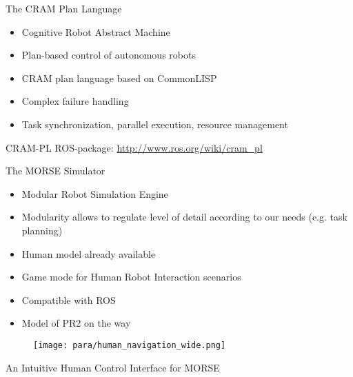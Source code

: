 \documentclass{beamer}
\begin{document}
\label{sec:cram}

\begin{frame}{The CRAM Plan Language}
  \begin{itemize}
  \item Cognitive Robot Abstract Machine
  \item Plan-based control of autonomous robots
  \item CRAM plan language based on CommonLISP
  \item Complex failure handling
  \item Task synchronization, parallel execution, resource management
  \end{itemize}
  \begin{block}{CRAM-PL ROS-package:}
      \centering
      \url{http://www.ros.org/wiki/cram_pl}
  \end{block}
\end{frame} 


\begin{frame}{The MORSE Simulator}
\begin{itemize}
\item Modular Robot Simulation Engine
\item Modularity allows to regulate level of detail according to our needs (e.g. task planning)
\item Human model already available
\item Game mode for Human Robot Interaction scenarios
\item Compatible with ROS
\item Model of PR2 on the way
\end{itemize}
 \begin{figure}[h]
    \texttt{[image: para/human\_navigation\_wide.png]} 
  \end{figure}

\end{frame}

\begin{frame}{An Intuitive Human Control Interface for MORSE}
 \begin{center}
 \end{center}
\end{frame}
\end{document}
